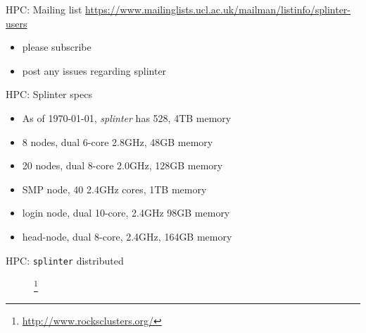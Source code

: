 \documentclass{beamer}
\begin{document}
\begin{frame}{HPC: Mailing list}
	\url{https://www.mailinglists.ucl.ac.uk/mailman/listinfo/splinter-users}
	\bigskip
	\begin{itemize}
		\item please subscribe
		\item post any issues regarding splinter
	\end{itemize}
\end{frame}

\begin{frame}{HPC: Splinter specs}
	\begin{itemize}
		\item As of \today, \emph{splinter} has 528, 4TB memory
		\item 8 nodes, dual 6-core 2.8GHz, 48GB memory 
		\item 20 nodes, dual 8-core 2.0GHz, 128GB memory
		\item SMP node, 40 2.4GHz cores, 1TB memory
		\item login node, dual 10-core, 2.4GHz 98GB memory
		\item head-node, dual 8-core, 2.4GHz, 164GB memory
	\end{itemize}
\end{frame}

\begin{frame}{HPC: \texttt{splinter} distributed}
  \begin{figure}
    \begin{center}
      \footnote{\url{http://www.rocksclusters.org/}}
    \end{center}
  \end{figure}
\end{frame}
\end{document}
